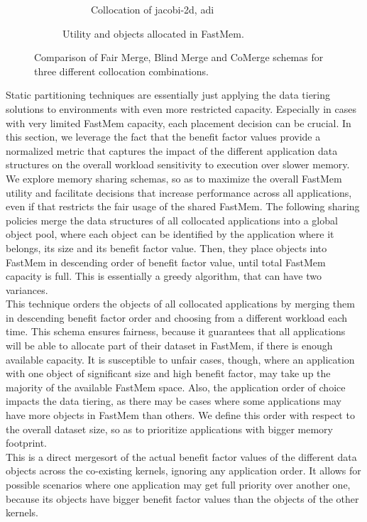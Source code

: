 \begin{figure}
\begin{subfigure}{\linewidth}
\begin{subfigure}{0.3\linewidth}
      \captionsetup{labelformat=empty}
    \caption{Collocation of jacobi-2d, adi}
    \end{subfigure}  
          \captionsetup{labelformat=empty}
  \caption{Utility and objects allocated in FastMem. }
  \end{subfigure}
  \caption{Comparison of Fair Merge, Blind Merge and CoMerge schemas for three different collocation combinations.}
    \label{fig:tiering2}

    \vspace{-0.1in}



\end{figure}

Static partitioning techniques are essentially just applying the data tiering solutions to environments with even more restricted capacity. Especially in cases with very limited FastMem capacity, each placement decision can be crucial. 
In this section, we leverage the fact that the benefit factor values provide a normalized metric that captures the impact of the different application data structures on the overall workload sensitivity to execution over slower memory. We explore memory sharing schemas, so as to maximize the overall FastMem utility and facilitate decisions that increase performance across all applications, even if that restricts the fair usage of the shared FastMem.	
The following sharing policies merge the data structures of all collocated applications into a global object pool, where each object can be identified by the application where it belongs, its size and its benefit factor value. Then, they place objects into FastMem in descending order of benefit factor value, until total FastMem capacity is full. This is essentially a greedy algorithm, 
that can have two variances. \\

 This technique orders the objects of all collocated applications by merging them in descending benefit factor order and choosing from a different workload each time.
This schema ensures fairness, because it guarantees that all applications will be able to allocate part of their dataset in FastMem, if there is enough available capacity. It is susceptible to unfair cases, though, where 
an application with one object of significant size and high benefit factor, may take up the majority of the available FastMem space. Also, the application order of choice impacts the data tiering, as there may be cases where some applications may have more objects in FastMem than others. We define this order with respect to the overall dataset size, so as to prioritize applications with bigger memory footprint. \\
 This is a direct mergesort of the actual benefit factor values of the different data objects across the co-existing kernels, ignoring any application order. It allows for possible scenarios where one application may get full priority over another one, 
because its objects have bigger benefit factor values than the objects of the other kernels.\\

